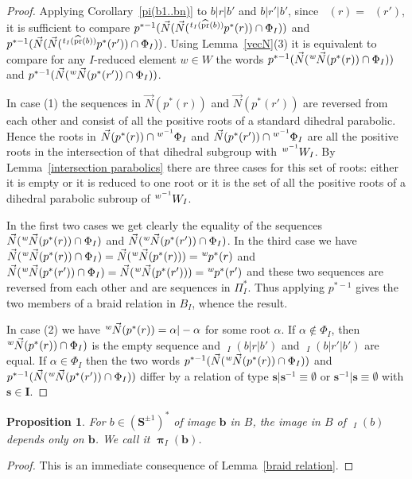 \documentclass{amsart}
\numberwithin{equation}{section}
\newtheorem{proposition}[equation]{Proposition}
\newcommand\vN{\vec N}
\newcommand\lexp[2]{\kern\scriptspace\vphantom{#2}^{#1}\kern-\scriptspace#2}
\newcommand\inv{^{-1}}
\newcommand\bb{{\mathbf b}}
\newcommand\bs{{\mathbf s}}
\newcommand\bI{{\mathbf I}}
\newcommand\bS{{\mathbf S}}
\DeclareMathOperator\hpr{\widehat{pr}}
\DeclareMathOperator\hpi{\hat\pi}
\DeclareMathOperator\bpi{\boldsymbol\pi}
\begin{document}
\begin{proof}
Applying Corollary~\ref{pi(b1..bn)} to $b|r|b'$ and $b|r'|b'$, 
since $\hpr(r)=\hpr(r')$, it is sufficient to compare
$p^{*-1}(\vN(\vN(\lexp{t_I(\hpr(b))}p^*(r))\cap \Phi_I))$ and
$p^{*-1}(\vN(\vN(\lexp{t_I(\hpr(b))}p^*(r'))\cap \Phi_I))$.
Using Lemma~\ref{vecN}(3) it is equivalent to compare for any $I$-reduced 
element $w\in W$ the words
$p^{*-1}(\vN(\lexp w\vN(p^*(r))\cap\Phi_I))$ and 
$p^{*-1}(\vN(\lexp w\vN(p^*(r'))\cap\Phi_I))$.

In case (1)
the  sequences in $\vN(p^*(r))$  and $\vN(p^*(r'))$ are  reversed from each
other  and  consist  of  all  the  positive  roots  of  a standard dihedral
parabolic.  Hence  the  roots  in  $\vN(p^*(r))\cap\lexp{w\inv}\Phi_I$  and
$\vN(p^*(r'))\cap\lexp{w\inv}\Phi_I$  are  all  the  positive  roots in the
intersection  of that  dihedral subgroup  with $\lexp{w\inv}W_I$.  By 
Lemma~\ref{intersection  parabolics} there are three cases for this set of roots:
either it is empty or it is reduced to one root or it is the set of all the
positive roots of a dihedral parabolic subroup of $\lexp{w\inv}W_I$.

In  the  first  two  cases  we  get  clearly  the equality of the sequences
$\vN(\lexp w\vN(p^*(r))\cap\Phi_I)$ and $\vN(\lexp
w\vN(p^*(r'))\cap\Phi_I)$.   In   the   third   case   we  have  $\vN(\lexp
w\vN(p^*(r))\cap\Phi_I)=\vN(\lexp   w\vN(p^*(r)))=\lexp   w   p^*(r)$   and
$\vN(\lexp    w\vN(p^*(r'))\cap\Phi_I)=\vN(\lexp   w\vN(p^*(r')))=\lexp   w
p^*(r')$  and  these  two  sequences  are  reversed from each other and are
sequences  in $\Pi_I^*$. Thus applying $p^{*-1}$ gives the two members of a
braid relation in $B_I$, whence the result.

In case (2) we have $\lexp w\vN(p^*(r))=\alpha|-\alpha$ for some root
$\alpha$. If $\alpha\notin \Phi_I$, then $\lexp w\vN(p^*(r))\cap\Phi_I)$
is the empty sequence and 
$\hpi_I(b|r|b')$ and $\hpi_I(b|r'|b')$ are equal. If $\alpha\in \Phi_I$ then 
the two words
$p^{*-1}(\vN(\lexp w\vN(p^*(r))\cap\Phi_I))$ and 
$p^{*-1}(\vN(\lexp w\vN(p^*(r'))\cap\Phi_I))$
differ by a relation of type $\bs|\bs\inv\equiv \emptyset$ or
$\bs\inv|\bs\equiv\emptyset$ with $\bs\in\bI$.
\end{proof}
\begin{proposition}\label{bien defini} For $b\in(\bS^{\pm1})^*$ of
image $\bb$ in $B$, the image in $B$ of $\hpi_I(b)$ depends only on $\bb$.
 We call it \index{piI@$\bpi_I$} $\bpi_I(\bb)$.
\end{proposition}
\begin{proof}
This is an immediate consequence of Lemma~\ref{braid
relation}.
\end{proof}
\end{document}
